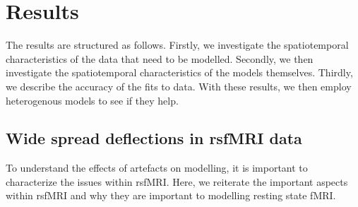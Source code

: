 \documentclass[oneside]{zHenriquesLab-StyleBioRxiv}
\begin{document}
\section*{Results}

The results are structured as follows. Firstly, we investigate the spatiotemporal characteristics of the data that need to be modelled. Secondly, we then investigate the spatiotemporal characteristics of the models themselves. Thirdly, we describe the accuracy of the fits to data. With these results, we then employ heterogenous models to see if they help.

\subsection*{Wide spread deflections in rsfMRI data}
To understand the effects of artefacts on modelling, it is important to characterize the issues within rsfMRI. Here, we reiterate the important aspects within rsfMRI and why they are important to modelling resting state fMRI. 
\end{document}
